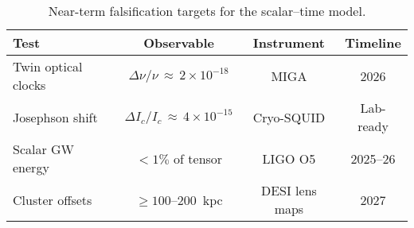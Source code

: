 \begin{table}[htbp]
  \centering
  \caption{Near-term falsification targets for the scalar–time model.}
  \label{tab:Falsifiers}
  \renewcommand{\arraystretch}{1.2}
  \begin{tabular}{@{} l c c c @{}}
    \toprule
    \textbf{Test} & \textbf{Observable} & \textbf{Instrument} & \textbf{Timeline} \\
    \midrule
    Twin optical clocks & $\Delta\nu/\nu \,\approx\, 2\times10^{-18}$ & MIGA & 2026 \\
    \hline
    Josephson shift & $\Delta I_c/I_c \,\approx\, 4\times10^{-15}$ & Cryo-SQUID & Lab-ready \\
    \hline
    Scalar GW energy & $< 1\%$ of tensor & LIGO O5 & 2025–26 \\
    \hline
    Cluster offsets & $\ge 100$–\SI{200}{kpc} & DESI lens maps & 2027 \\
    \bottomrule
  \end{tabular}
\end{table}

